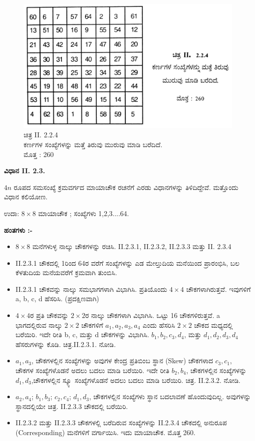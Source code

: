 \begin{itemize}
\begin{figure}[h]
	\end{figure}
	\begin{figure}[h]
	\includegraphics{src/figures/chap3/fig3.23.jpg}
	\caption{ಚಿತ್ರ II. 2.2.4 \\ ಕರ್ಣಗಳ ಸಂಖ್ಯೆಗಳನ್ನು ಮತ್ತೆ ತಿರುವು ಮುರುವು ಮಾಡಿ ಬರೆದಿದೆ. \\ ಮೊತ್ತ : 260}
	\end{figure}
\end{itemize}
\textbf{ವಿಧಾನ II. 2.3.}

$4n$ ರೂಪದ ಸಮಸಂಖ್ಯೆ ಕ್ರಮವರ್ಗದ ಮಾಯಾಚೌಕ ರಚನೆಗೆ ಎರಡು ವಿಧಾನಗಳನ್ನು ತಿಳಿದಿದ್ದೇವೆ. ಮತ್ತೊಂದು ವಿಧಾನ ಕಲಿಯೋಣ.

ಉದಾ: $8 \times 8$ ಮಾಯಾಚೌಕ ; ಸಂಖ್ಯೆಗಳು 1,2,3....64.

\textbf{ಹಂತಗಳು :-}
\begin{itemize}
	\item $8 \times 8$ ಮನೆಗಳುಳ್ಳ ನಾಲ್ಕು ಚೌಕಗಳನ್ನು ರಚಿಸಿ. II.2.3.1, II.2.3.2, II.2.3.3 ಮತ್ತು II. 2.3.4
	\item II.2.3.1 ಚೌಕದಲ್ಲಿ 1ರಿಂದ 64ರ ವರೆಗೆ ಸಂಖ್ಯೆಗಳನ್ನು ಎಡ ಮೇಲ್ತುದಿಯ ಮನೆಯಿಂದ ಪ್ರಾರಂಭಿಸಿ, ಬಲ ಕೆಳತುದಿಯ ಮನೆಯವರೆಗೆ ಕ್ರಮವಾಗಿ ತುಂಬಿಸಿ.
	\item II.2.3.1 ಚೌಕವನ್ನು ನಾಲ್ಕು ಸಮಭಾಗಗಳಾಗಿ ವಿಭಾಗಿಸಿ. ಪ್ರತಿಯೊಂದು $4 \times 4$ ಚೌಕಗಳಾಗಿರುತ್ತವೆ. ಇವುಗಳಿಗೆ a, b, c, d ಹೆಸರಿಸಿ. (ಪ್ರದಕ್ಷಿಣವಾಗಿ)
	\item $4 \times 4$ರ ಪ್ರತಿ ಚೌಕವನ್ನು $2 \times 2$ರ ನಾಲ್ಕು ಚೌಕಗಳಾಗಿ ವಿಭಾಗಿಸಿ. ಒಟ್ಟು 16 ಚೌಕಗಳಿರುತ್ತವೆ. a ಭಾಗದಲ್ಲಿರುವ ನಾಲ್ಕು $2 \times 2$ ಚೌಕಗಳಿಗೆ $a_1, a_2, a_3, a_4$ ಎಂದು ಹೆಸರಿಸಿ $2 \times 2$ ಚೌಕದ ಮಧ್ಯದಲ್ಲಿ ಬರೆಯಿರಿ. ಇದೇ ರೀತಿ b, c, ಮತ್ತು d ಚೌಕಗಳನ್ನು ವಿಭಾಗಿಸಿ. $b_1, b_2, c_3, d_4$, ಮತ್ತು $d_1, d_2, d_3, d_4$ ಹೆಸರುಗಳನ್ನು ಕೊಡಿ. ಚಿತ್ರ.II.2.3.1. ನೋಡಿ.

	\item $a_1, a_3$, ಚೌಕಗಳಲ್ಲಿನ ಸಂಖ್ಯೆಗಳನ್ನು ಅವುಗಳ ಕೇಂದ್ರ ಪ್ರತಿಬಿಂಬ ಸ್ಥಾನ (Skew) ಚೌಕಗಳಾದ $c_3, c_1$, ಚೌಕಗಳ ಸಂಖ್ಯೆಗಳೊಡನೆ ಅದಲು ಬದಲು ಮಾಡಿ ಬರೆಯಿರಿ. ಇದೇ ರೀತಿ $b_2, b_4$, ಚೌಕಗಳಲ್ಲಿನ ಸಂಖ್ಯೆಗಳನ್ನು $d_1, d_3$,ಚೌಕಗಳಲ್ಲಿನ ಸ್ಕ್ಯೂ  ಸಂಖ್ಯೆಗಳೊಡನೆ ಅದಲು ಬದಲು ಮಾಡಿ ಬರೆಯಿರಿ. ಚಿತ್ರ. II.2.3.2. ನೋಡಿ.
	\item $a_2, a_4$; $b_1, b_3$; $c_2, c_4$; $d_1, d_3$, ಚೌಕಗಳಲ್ಲಿನ ಸಂಖ್ಯೆಗಳು ಸ್ಥಾನ ಬದಲಾವಣೆ ಹೊಂದುವುದಿಲ್ಲ. ಅವುಗಳನ್ನು ಸ್ಥಾನದಲ್ಲಿಯೇ ಚಿತ್ರ. II.2.3.3 ಚೌಕದಲ್ಲಿ ಬರೆಯಿರಿ.
	\item II.2.3.2 ಮತ್ತು II.2.3.3 ಚೌಕಗಳಲ್ಲಿ ಬರೆದಿರುವ ಸಂಖ್ಯೆಗಳನ್ನು II.2.3.4 ಚೌಕದಲ್ಲಿ ಅನುರೂಪ (Corresponding) ಮನೆಗಳಿಗೆ ವರ್ಗಾಯಿಸಿ. ಇದು ಮಾಯಾಚೌಕ. ಮೊತ್ತ 260.
\end{itemize}

